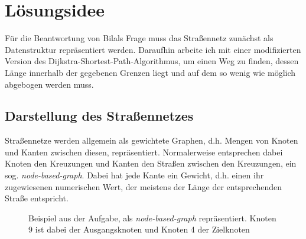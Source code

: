 \documentclass[a4paper,10pt,ngerman]{scrartcl}
\title{\Aufgabe}
\author{\Name\\Team-ID: \Einsendenummer}
\date{\today}
\begin{document}
\maketitle
\tableofcontents

\section{Lösungsidee}
Für die Beantwortung von Bilals Frage muss das Straßennetz zunächst als Datenstruktur repräsentiert werden.
Daraufhin arbeite ich mit einer modifizierten Version des Dijkstra-Shortest-Path-Algorithmus, um einen Weg zu finden, dessen Länge innerhalb der gegebenen Grenzen liegt und auf dem so wenig wie möglich abgebogen werden muss.

\subsection{Darstellung des Straßennetzes}
\label{sec:idea:representation}
Straßennetze werden allgemein als gewichtete Graphen, d.h. Mengen von Knoten und Kanten zwischen diesen, repräsentiert.
Normalerweise entsprechen dabei Knoten den Kreuzungen und Kanten den Straßen zwischen den Kreuzungen, ein sog. \textit{node-based-graph}.
Dabei hat jede Kante ein Gewicht, d.h. einen ihr zugewiesenen numerischen Wert, der meistens der Länge der entsprechenden Straße entspricht.

\begin{figure}
\centering
{}
\label{fig:graph-idee}
\caption{Beispiel aus der Aufgabe, als \textit{node-based-graph} repräsentiert. \newline Knoten 9 ist dabei der Ausgangsknoten und Knoten 4 der Zielknoten}
\end{figure}
\end{document}
